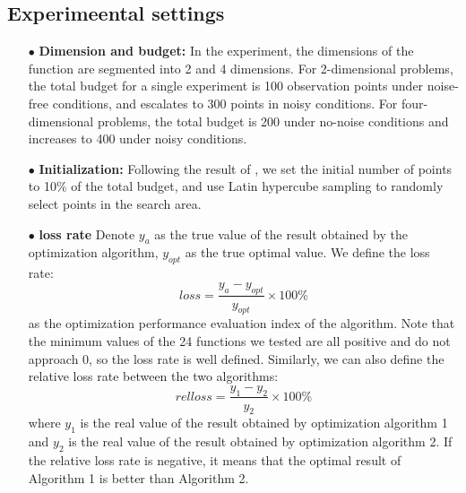 \documentclass{article}
\begin{document}
\subsection{Experimeental settings}
\begin{itemize}[itemsep=4pt,topsep=0pt,parsep=0pt]
\item[$\bullet$] \textbf{Dimension and budget:} In the experiment, the dimensions of the function are segmented into 2 and 4 dimensions. For 2-dimensional problems, the total budget for a single experiment is 100 observation points under noise-free conditions, and escalates to 300 points in noisy conditions. For four-dimensional problems, the total budget is 200 under no-noise conditions and increases to 400 under noisy conditions.
\item[$\bullet$] \textbf{Initialization:} Following the result of \citep{Bossek2020Initial}, we set the initial number of points to 10$\%$ of the total budget, and use Latin hypercube sampling to randomly select points in the search area.
\item[$\bullet$] \textbf{loss rate} Denote $y_a$ as the true value of the result obtained by the optimization algorithm, $y_{opt}$ as the true optimal value. We define the loss rate:
\begin{equation}\label{eq9}
	loss = \frac{y_a - y_{opt}}{y_{opt}}\times 100\%
\end{equation}
 as the optimization performance evaluation index of the algorithm. Note that the minimum values of the 24 functions we tested are all positive and do not approach 0, so the loss rate is well defined. Similarly, we can also define the relative loss rate between the two algorithms:
\begin{equation}\label{eq10}
	relloss = \frac{y_1 - y_2}{y_2}\times 100\%
\end{equation}
 where $y_1$ is the real value of the result obtained by optimization algorithm 1 and $y_2$ is the real value of the result obtained by optimization algorithm 2. If the relative loss rate is negative, it means that the optimal result of Algorithm 1 is better than Algorithm 2.


\end{itemize}
\end{document}
